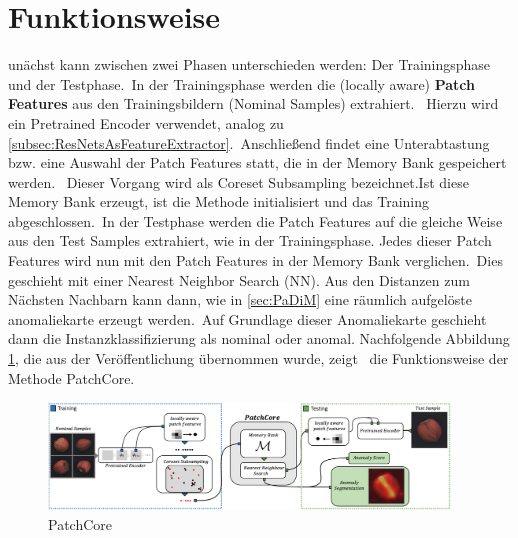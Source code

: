 \section{Funktionsweise}
\label{sec:Funktionsweise}
unächst kann zwischen zwei Phasen unterschieden werden: Der Trainingsphase und der Testphase.\
In der Trainingsphase werden die \glqq (locally aware) \textbf{Patch Features}\grqq{} aus den Trainingsbildern (\glqq Nominal Samples\grqq{}) extrahiert. \ 
Hierzu wird ein \glqq Pretrained Encoder\grqq{} verwendet, analog zu \ref{subsec:ResNetsAsFeatureExtractor}.\
Anschließend findet eine Unterabtastung bzw. eine Auswahl der Patch Features statt, die in der \glqq Memory Bank\grqq{} gespeichert werden. \ 
Dieser Vorgang wird als \glqq Coreset Subsampling\grqq{} bezeichnet.Ist diese Memory Bank erzeugt, ist die Methode initialisiert und das Training abgeschlossen.\ 
In der Testphase werden die Patch Features auf die gleiche Weise aus den \glqq Test Samples\grqq{} extrahiert, wie in der Trainingsphase. Jedes dieser Patch Features wird nun mit den Patch Features in der Memory Bank verglichen.\ 
Dies geschieht mit einer \glqq Nearest Neighbor Search\grqq{} (NN). Aus den Distanzen zum Nächsten Nachbarn kann dann, wie in \ref{sec:PaDiM} eine räumlich aufgelöste anomaliekarte erzeugt werden.\ 
Auf Grundlage dieser Anomaliekarte geschieht dann die Instanzklassifizierung als nominal oder anomal. Nachfolgende Abbildung \ref{fig:PatchCore}, die aus der Veröffentlichung übernommen wurde, zeigt \ 
die Funktionsweise der Methode PatchCore.\
\begin{figure}[h]
    \centering
    \includegraphics[width=0.95\textwidth]{bilder/patchcore.png}
    \caption{PatchCore}
    \label{fig:PatchCore}
\end{figure}

